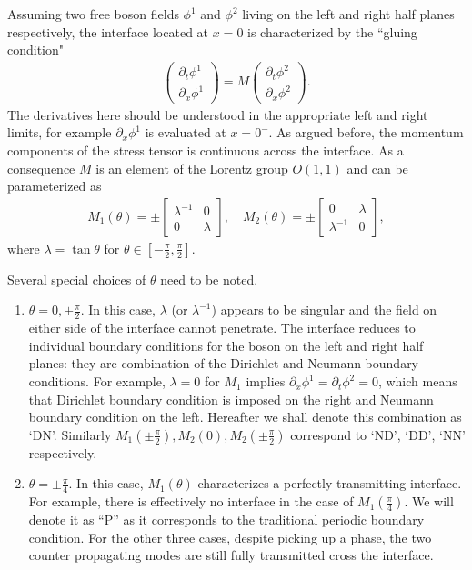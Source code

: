 Assuming two free boson fields $\phi^1$ and $\phi^2$ living on the left and right half planes respectively, the interface located at $x = 0$ is characterized by the ``gluing condition"
\begin{equation}\begin{aligned}
\label{eq:def_M}
\begin{pmatrix}
\partial_t\phi^1\\
\partial_x\phi^1
\end{pmatrix}
=M\begin{pmatrix}
\partial_t\phi^2\\
\partial_x\phi^2
\end{pmatrix}.
\end{aligned}\end{equation}
The derivatives here should be understood in the appropriate left and right limits, for example $\partial_x \phi^1$ is evaluated at $ x = 0^-$. As argued before, the momentum components of the stress tensor is continuous across the interface. As a consequence $M$ is an element of the Lorentz group $O(1,1)$ and can be parameterized as
\begin{equation}\begin{aligned}
\label{eq:M1M2}
M_1(\theta)=\pm
\begin{bmatrix}
\lambda^{-1} & 0 \\
0 & \lambda
\end{bmatrix},\quad
M_2(\theta)=\pm
\begin{bmatrix}
0 & \lambda  \\
\lambda^{-1} & 0 
\end{bmatrix},
\end{aligned}\end{equation}
where $\lambda=\tan\theta$ for $\theta\in\left[-\frac{\pi}{2},\frac{\pi}{2}\right]$. 

Several special choices of $\theta$ need to be noted. 
\begin{enumerate}
\item $\theta=0,\pm \frac{\pi}{2}$. In this case, $\lambda$ (or $\lambda^{-1}$) appears to be singular and the field on either side of the interface cannot penetrate. The interface reduces to individual boundary conditions for the boson on the left and right half planes: they are combination of the Dirichlet and Neumann boundary conditions. For example, $\lambda = 0$ for $M_1$ implies $\partial_x\phi^1 = \partial_t\phi^2 =0$, which means that Dirichlet boundary condition is imposed on the right and Neumann boundary condition on the left. Hereafter we shall denote this combination as `DN'. Similarly $M_1(\pm\frac{\pi}{2}),M_2(0),M_2(\pm \frac{\pi}{2})$ correspond to `ND', `DD', `NN' respectively. 
\item $\theta = \pm \frac{\pi}{4}$. In this case, $M_1(\theta)$ characterizes a perfectly transmitting interface. For example, there is effectively no interface in the case of $M_1( \frac{\pi}{4})$. We will denote it as ``P'' as it corresponds to the traditional periodic boundary condition. For the other three cases, despite picking up a phase, the two counter propagating modes are still fully transmitted cross the interface. 
\end{enumerate}

